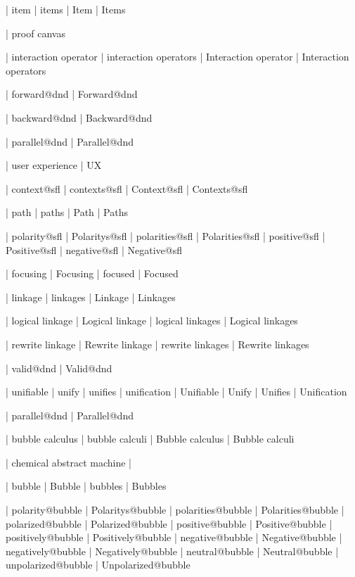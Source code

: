 
 | item
 | items
 | Item
 | Items

 | proof canvas

 | interaction operator
 | interaction operators
 | Interaction operator
 | Interaction operators

 | forward@dnd
 | Forward@dnd

 | backward@dnd
 | Backward@dnd

 | parallel@dnd
 | Parallel@dnd


 | user experience
 | UX
 
 | context@sfl
 | contexts@sfl
 | Context@sfl
 | Contexts@sfl

 | path
 | paths
 | Path
 | Paths

 | polarity@sfl
 | Polaritys@sfl
 | polarities@sfl
 | Polarities@sfl
 | positive@sfl
 | Positive@sfl
 | negative@sfl
 | Negative@sfl

 | focusing
 | Focusing
 | focused
 | Focused

 | linkage
 | linkages
 | Linkage
 | Linkages

 | logical linkage
 | Logical linkage
 | logical linkages
 | Logical linkages

 | rewrite linkage
 | Rewrite linkage
 | rewrite linkages
 | Rewrite linkages

 | valid@dnd
 | Valid@dnd

 | unifiable
 | unify
 | unifies
 | unification
 | Unifiable
 | Unify
 | Unifies
 | Unification

 | parallel@dnd
 | Parallel@dnd


 | bubble calculus
 | bubble calculi
 | Bubble calculus
 | Bubble calculi

 | chemical abstract machine
 | \cham

 | bubble
 | Bubble
 | bubbles
 | Bubbles

 | polarity@bubble
 | Polaritys@bubble
 | polarities@bubble
 | Polarities@bubble
 | polarized@bubble
 | Polarized@bubble
 | positive@bubble
 | Positive@bubble
 | positively@bubble
 | Positively@bubble
 | negative@bubble
 | Negative@bubble
 | negatively@bubble
 | Negatively@bubble
 | neutral@bubble
 | Neutral@bubble
 | unpolarized@bubble
 | Unpolarized@bubble

